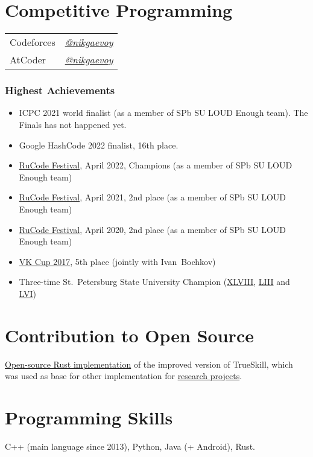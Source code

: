 \documentclass[a4paper, 11pt]{article}
\begin{document}
\section*{Competitive Programming}

\begin{tabular}{ll}
	Codeforces & \href{https://codeforces.com/profile/nikgaevoy}{{\it @nikgaevoy}} \\
	AtCoder & \href{https://atcoder.jp/users/nikgaevoy}{{\it @nikgaevoy}}
\end{tabular}

\subsubsection*{Highest Achievements}

\begin{itemize}
	\item ICPC 2021 world finalist (as a member of SPb SU LOUD Enough team). The Finals has not happened yet.

	\item Google HashCode 2022 finalist, 16th place.

	\item \href{https://rucode.net/kak-eto-bylo/}{RuCode Festival}, April 2022, Champions (as a member of SPb SU LOUD Enough team)

	\item \href{https://rucode.net/kak-eto-bylo/}{RuCode Festival}, April 2021, 2nd place (as a member of SPb SU LOUD Enough team)

	\item \href{http://rucode.it-edu.mipt.ru/rucode2020resAB}{RuCode Festival}, April 2020, 2nd place (as a member of SPb SU LOUD Enough team)

	\item \href{https://codeforces.com/blog/entry/53192}{VK Cup 2017}, 5th place (jointly with Ivan~Bochkov)

	\item Three-time St.~Petersburg State University Champion (\href{https://acm.math.spbu.ru/cgi-bin/monitor.pl/n171015.dat}{XLVIII}, \href{https://acm.math.spbu.ru/cgi-bin/monitor.pl/n190421.dat}{LIII} and \href{https://acm.math.spbu.ru/cgi-bin/monitor.pl/n201206.dat}{LVI})
 \end{itemize}

\section*{Contribution to Open Source}

\href{https://github.com/nikgaevoy/SPbTrueSkill}{Open-source Rust implementation} of the improved version of TrueSkill, which was used as base for other implementation for \href{https://arxiv.org/abs/2101.00400}{research projects}.

\section*{Programming Skills}

C++ (main language since 2013), Python, Java (+ Android), Rust.
\end{document}
